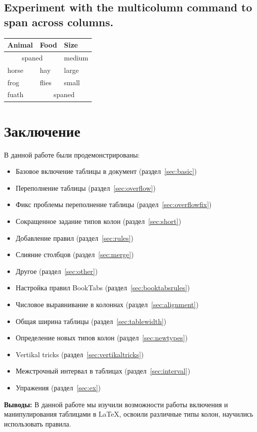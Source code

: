 \documentclass{article}
\begin{document}
  \subsection{Experiment with the multicolumn command to span across columns.}
  \label{subsec:width}


  \begin{tabular}{lll}
  \toprule
    Animal & Food & Size \\
  \midrule
    \multicolumn{2}{c}{spaned} & medium \\
    horse & hay & large \\
    frog & flies & small \\
    fuath & \multicolumn{2}{c}{spaned} \\
  \bottomrule
  \end{tabular}

  \section{Заключение}
  \label{sec:conclusion}
  
  В данной работе были продемонстрированы:
  \begin{itemize}
    \item Базовое включение таблицы в документ (раздел~\ref{sec:basic})
    \item Переполнение таблицы (раздел~\ref{sec:overflow})
    \item Фикс проблемы переполнение таблицы (раздел~\ref{sec:overflowfix})
    \item Сокращенное задание типов колон (раздел~\ref{sec:short})
    \item Добавление правил (раздел~\ref{sec:rules})
    \item Слияние столбцов (раздел~\ref{sec:merge})
    \item Другое (раздел~\ref{sec:other})
    \item Настройка правил BookTabs (раздел~\ref{sec:booktabsrules})
    \item Числовое выравнивание в колоннах (раздел~\ref{sec:alignment})
    \item Общая ширина таблицы (раздел~\ref{sec:tablewidth})
    \item Определение новых типов колон (раздел~\ref{sec:newtypes})
    \item Vertikal tricks (раздел~\ref{sec:vertikaltricks})
    \item Межстрочный интервал в таблицах (раздел~\ref{sec:interval})
    \item Упражения (раздел~\ref{sec:ex})
  \end{itemize}

  \textbf{Выводы:} В данной работе мы изучили возможности работы включения и манипулирования таблицами в LaTeX, освоили различные типы колон, научились использовать правила.
\end{document}

